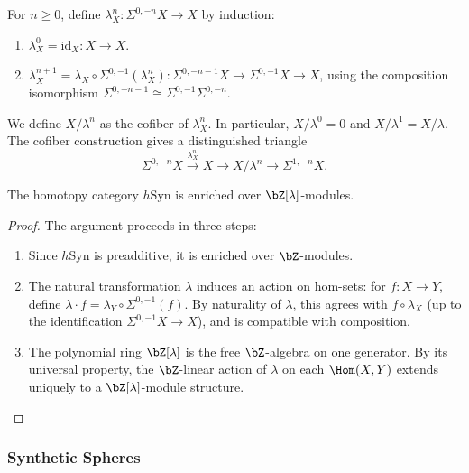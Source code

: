 \begin{definition}\label{prereq:def:lambda-power}
    \leanok
    For $n \ge 0$, define $\lambda^n_X: \Sigma^{0,-n}X \to X$ by induction:
    \begin{enumerate}
        \item $\lambda^0_X = \mathrm{id}_X: X \to X$.
        \item $\lambda^{n+1}_X = \lambda_X \circ \Sigma^{0,-1}(\lambda^n_X): \Sigma^{0,-n-1}X \to \Sigma^{0,-1}X \to X$, using the composition isomorphism $\Sigma^{0,-n-1} \cong \Sigma^{0,-1}\Sigma^{0,-n}$.
    \end{enumerate}
    We define $X/\lambda^n$ as the cofiber of $\lambda^n_X$. In particular, $X/\lambda^0 = 0$ and $X/\lambda^1 = X/\lambda$. The cofiber construction gives a distinguished triangle
    $$\Sigma^{0,-n}X \xrightarrow{\lambda^n_X} X \to X/\lambda^n \to \Sigma^{1,-n}X.$$
\end{definition}

\begin{axiom}\label{prereq:ax:zlambda-enrichment}
    \leanok
    The homotopy category $h\mathrm{Syn}$ is enriched over $\bZ[\lambda]$-modules.
\end{axiom}
\begin{proof}
    The argument proceeds in three steps:
    \begin{enumerate}
        \item Since $h\mathrm{Syn}$ is preadditive, it is enriched over $\bZ$-modules.
        \item The natural transformation $\lambda$ induces an action on hom-sets: for $f: X \to Y$, define $\lambda \cdot f = \lambda_Y \circ \Sigma^{0,-1}(f)$. By naturality of $\lambda$, this agrees with $f \circ \lambda_X$ (up to the identification $\Sigma^{0,-1}X \to X$), and is compatible with composition.
        \item The polynomial ring $\bZ[\lambda]$ is the free $\bZ$-algebra on one generator. By its universal property, the $\bZ$-linear action of $\lambda$ on each $\Hom(X,Y)$ extends uniquely to a $\bZ[\lambda]$-module structure.
    \end{enumerate}
\end{proof}

\subsubsection{Synthetic Spheres}\label{sec:prereq-syn-spheres}

